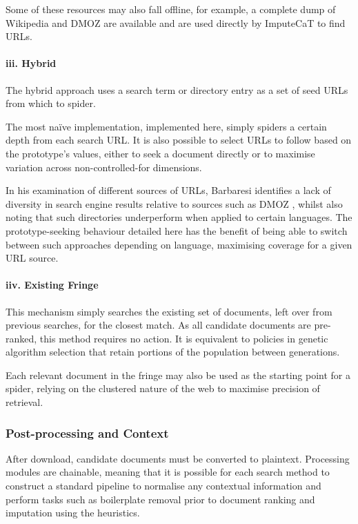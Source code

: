 Some of these resources may also fall offline, for example, a complete dump of Wikipedia and DMOZ are available and are used directly by ImputeCaT to find URLs.


\paragraph{iii. Hybrid}
The hybrid approach uses a search term or directory entry as a set of seed URLs from which to spider.

The most na\"ive implementation, implemented here, simply spiders a certain depth from each search URL\@.  It is also possible to select URLs to follow based on the prototype's values, either to seek a document directly or to maximise variation across non-controlled-for dimensions.

In his examination of different sources of URLs, Barbaresi identifies a lack of diversity in search engine results relative to sources such as DMOZ\cite{barbaresi2014finding}%
, whilst also noting that such directories underperform when applied to certain languages.  The prototype-seeking behaviour detailed here has the benefit of being able to switch between such approaches depending on language, maximising coverage for a given URL source.




\paragraph{iiv. Existing Fringe}
This mechanism simply searches the existing set of documents, left over from previous searches, for the closest match.  As all candidate documents are pre-ranked, this method requires no action.  It is equivalent to policies in genetic algorithm selection that retain portions of the population between generations.

Each relevant document in the fringe may also be used as the starting point for a spider, relying on the clustered nature of the web to maximise precision of retrieval.  


\subsubsection{Post-processing and Context}
After download, candidate documents must be converted to plaintext.  Processing modules are chainable, meaning that it is possible for each search method to construct a standard pipeline to normalise any contextual information and perform tasks such as boilerplate removal prior to document ranking and imputation using the heuristics.

